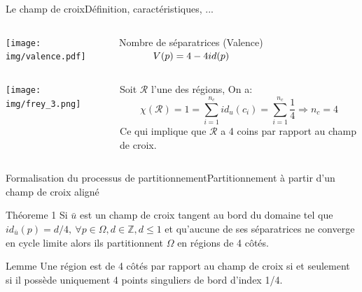 

\begin{frame}{Le champ de croix}{Définition, caractéristiques, ...}
    \begin{columns}
        \begin{column}{0.6\textwidth}
            \centering
            \texttt{[image: img/valence.pdf]}\\\vspace{0.3cm}
        \end{column}
        \begin{column}{0.4\textwidth}
            \begin{onerablock}{\small Nombre de séparatrices (Valence)}
            \vspace{0.5cm}
            $
            \hspace{1.2cm}
            V(p)=4-4id(p)
            \hspace{1.2cm}
            $
            \vspace{0.5cm}
            \end{onerablock}
        \end{column}
    \end{columns}
    \begin{columns}
        \begin{column}{0.4\textwidth}
            \centering
            \texttt{[image: img/frey\_3.png]}\\\vspace{0.15cm}
            \caption{\footnotesize Partitionnement}
        \end{column}
        \begin{column}{0.6\textwidth}
            Soit $\mathcal{R}$ l'une des régions, On a:
    $$\chi(\mathcal{R})=1=\sum_{i=1}^{n_c}id_u(c_i)=\sum_{i=1}^{n_c}\frac{1}{4}\Longrightarrow n_c=4$$
    Ce qui implique que $\mathcal{R}$ a 4 coins par rapport au champ de croix.
        \end{column}
    \end{columns}
\end{frame}

    \begin{frame}{Formalisation du processus de partitionnement}{Partitionnement à partir d'un champ de croix aligné}
    \begin{onerablock}{Théoreme 1}
    Si $\bar{u}$ est un champ de croix tangent au bord du domaine tel que $id_{\bar{u}}(p) = d/4,~\forall p\in\Omega, d\in\mathbb{Z},d\leq 1$  et qu'aucune de ses séparatrices ne converge en cycle limite alors ils partitionnent $\Omega$ en régions de 4 côtés.
    \end{onerablock}
    \vspace{0.4cm}
    \begin{onerablock}{Lemme}
    Une région est de 4 côtés par rapport au champ de croix si et seulement si il possède uniquement 4 points singuliers de bord d'index 1/4.
    \end{onerablock}
    \vspace{0.4cm}
    \end{frame}

